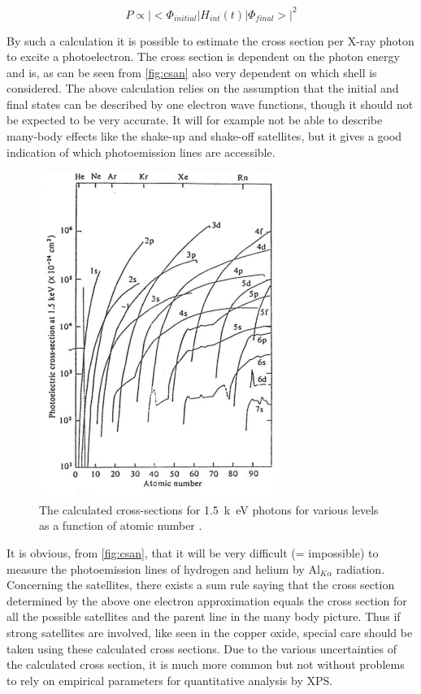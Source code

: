 \begin{equation}
P\propto |<\Phi_{initial}|H_{int}(t)|\Phi_{final}>|^2
\end{equation}

By such a calculation it is possible to estimate the cross section per X-ray photon to excite a photoelectron. The cross section is dependent on the photon  energy and is, as can be seen from \autoref{fig:csan} also very dependent on which shell is considered. The above calculation relies on the assumption that the initial and final states can be described by one electron wave functions, though it should not be expected to be very accurate. It will for example not be able to describe many-body effects like the shake-up and shake-off satellites, but it gives a good indication of which photoemission lines are accessible.

\begin{figure}[h!]
	\begin{center}
	\includegraphics[scale=4]{figures/04_22.png}
	\caption{The calculated cross-sections for \SI{1.5}{k\electronvolt} photons for various levels as a function of atomic number \cite{shofield}.}
	\label{fig:csan}
	\end{center}
\end{figure}
             
It is obvious, from \autoref{fig:csan}, that it
will be very difficult (= impossible) to measure the photoemission lines of hydrogen and helium by Al$_{K\alpha}$ radiation. Concerning the satellites, there exists a sum rule saying that the cross section determined by the above one electron approximation equals the cross section for all the possible satellites and the parent line in the many body picture. Thus if strong satellites are involved, like seen in the copper oxide, special care should be taken using these calculated cross sections. Due to the various uncertainties of the calculated cross section, it is much more common but not without problems to rely on empirical parameters for quantitative analysis by XPS.

